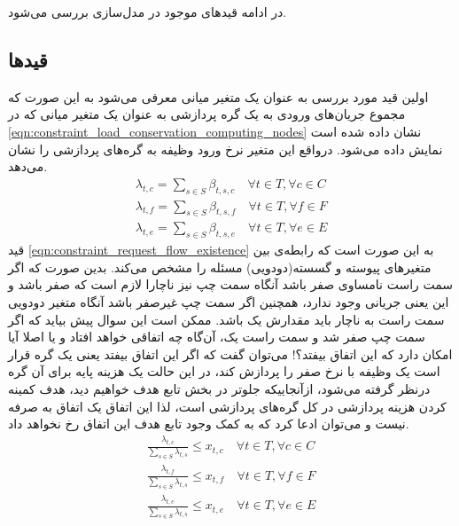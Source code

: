 	در ادامه قیدهای موجود در مدل‌سازی بررسی می‌شود. 
    \subsection{قیدها}
    اولین قید مورد بررسی به عنوان یک متغیر میانی معرفی می‌شود به این صورت که مجموع جریان‌های ورودی به یک گره پردازشی به عنوان یک متغیر میانی که در \cref{eqn:constraint_load_conservation_computing_nodes} نشان داده شده است نمایش داده می‌شود. درواقع این متغیر نرخ ورود وظیفه به گره‌های پردازشی را نشان می‌دهد.
    \begin{subequations}\label{eqn:constraint_load_conservation_computing_nodes}
    	\begin{align}
    	\lambda_{t,c} = \sum_{s\in S}\beta_{t,s,c} \quad \forall{t \in T}, \forall{c \in C} \\
    	\lambda_{t,f} = \sum_{s\in S}\beta_{t,s,f} \quad \forall{t \in T}, \forall{f \in F} \\
    	\lambda_{t,e} = \sum_{s\in S}\beta_{t,s,e} \quad \forall{t \in T}, \forall{e \in E}
    	\end{align}
    \end{subequations}
	قید \cref{eqn:constraint_request_flow_existence} به این صورت است که رابطه‌ی بین متغیرهای پیوسته و گسسته(دودویی) مسئله را مشخص می‌کند. بدین صورت که اگر سمت راست نامساوی صفر باشد آنگاه سمت چپ نیز ناچارا لازم است که صفر باشد و این یعنی جریانی وجود ندارد، همچنین اگر سمت چپ غیرصفر باشد آنگاه متغیر دودویی سمت راست به ناچار باید مقدارش یک باشد. ممکن است این سوال پیش بیاید که اگر سمت چپ صفر شد و سمت راست یک، آن‌گاه چه اتفاقی خواهد افتاد و یا اصلا آیا امکان دارد که این اتفاق بیفتد؟! می‌توان گفت که اگر این اتفاق بیفتد یعنی یک گره قرار است یک وظیفه با نرخ صفر را پردازش کند، در این حالت یک هزینه پایه برای آن گره درنظر گرفته می‌شود، ازآنجاییکه جلوتر در بخش تابع هدف خواهیم دید، هدف کمینه کردن هزینه پردازشی در کل گره‌های پردازشی است، لذا این اتفاق یک اتفاق به صرفه نیست و می‌توان ادعا کرد که به کمک وجود تابع هدف این اتفاق رخ نخواهد داد.
	\begin{subequations}\label{eqn:constraint_request_flow_existence}
		\begin{align}
		\frac{\lambda_{t,c}}{\sum_{s\in S}\lambda_{t,s}} \le x_{t,c} \quad \forall{t \in T}, \forall{c \in C} \\
		\frac{\lambda_{t,f}}{\sum_{s\in S}\lambda_{t,s}} \le x_{t,f} \quad \forall{t \in T}, \forall{f \in F} \\
		\frac{\lambda_{t,e}}{\sum_{s\in S}\lambda_{t,s}} \le x_{t,e} \quad \forall{t \in T}, \forall{e \in E}
		\end{align}
	\end{subequations}
